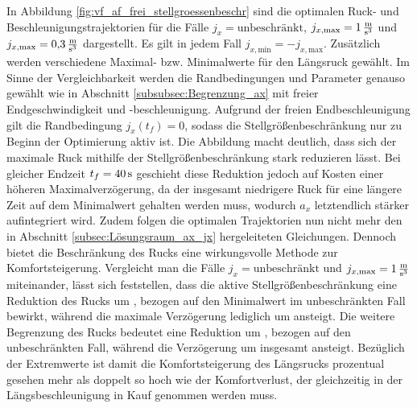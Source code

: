 In Abbildung \ref{fig:vf_af_frei_stellgroessenbeschr} sind die optimalen Ruck- und Beschleunigungstrajektorien für die Fälle $j_x= \textrm{unbeschränkt}$, $j_{x,\textrm{max}} = 1\,\mathrm{\frac{\mathrm{m}}{\mathrm{s^3}}}$ und $j_{x,\textrm{max}} = 0{,}3\,\mathrm{\frac{\mathrm{m}}{\mathrm{s^3}}}$ dargestellt. Es gilt in jedem Fall $j_{x,\textrm{min}} = -j_{x,\textrm{max}}$. Zusätzlich werden verschiedene Maximal- bzw. Minimalwerte für den Längsruck gewählt. Im Sinne der Vergleichbarkeit werden die Randbedingungen und Parameter genauso gewählt wie in Abschnitt \ref{subsubsec:Begrenzung_ax} mit freier Endgeschwindigkeit und -beschleunigung. Aufgrund der freien Endbeschleunigung gilt die Randbedingung $j_x(t_f) = 0$, sodass die Stellgrößenbeschränkung nur zu Beginn der Optimierung aktiv ist. Die Abbildung macht deutlich, dass sich der maximale Ruck mithilfe der Stellgrößenbeschränkung stark reduzieren lässt. Bei gleicher Endzeit $t_f = 40\,\mathrm{s}$ geschieht diese Reduktion jedoch auf Kosten einer höheren Maximalverzögerung, da der insgesamt niedrigere Ruck für eine längere Zeit auf dem Minimalwert gehalten werden muss, wodurch $a_x$ letztendlich stärker aufintegriert wird. Zudem folgen die optimalen Trajektorien nun nicht mehr den in Abschnitt \ref{subsec:Lösungsraum_ax_jx} hergeleiteten Gleichungen. Dennoch bietet die Beschränkung des Rucks eine wirkungsvolle Methode zur Komfortsteigerung. Vergleicht man die Fälle $j_x= \textrm{unbeschränkt}$ und $j_{x,\textrm{max}} = 1\,\mathrm{\frac{\mathrm{m}}{\mathrm{s^3}}}$ miteinander, lässt sich feststellen, dass die aktive Stellgrößenbeschränkung eine Reduktion des Rucks um , bezogen auf den Minimalwert im unbeschränkten Fall bewirkt, während die maximale Verzögerung lediglich um  ansteigt. Die weitere Begrenzung des Rucks bedeutet eine Reduktion um , bezogen auf den unbeschränkten Fall, während die Verzögerung um insgesamt  ansteigt. Bezüglich der Extremwerte ist damit die Komfortsteigerung des Längsrucks prozentual gesehen mehr als doppelt so hoch wie der Komfortverlust, der gleichzeitig in der Längsbeschleunigung in Kauf genommen werden muss. 

